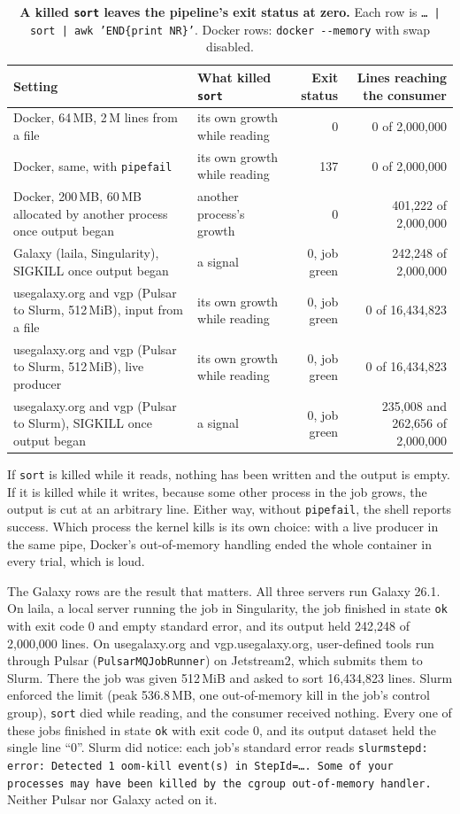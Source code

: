 \documentclass[11pt,letterpaper]{article}
\newcommand{\code}[1]{\texttt{#1}}
\begin{document}
\begin{table}[ht]
\centering
\small
\caption{\textbf{A killed \code{sort} leaves the pipeline's exit status at zero.} Each row is
\code{\ldots{} | sort | awk 'END\{print NR\}'}. Docker rows: \code{docker -{}-memory} with swap disabled.}
\label{tab:outcomes}
\begin{tabularx}{\textwidth}{@{}>{\raggedright\arraybackslash}X l r r@{}}
\toprule
Setting & What killed \code{sort} & Exit status & Lines reaching the consumer \\
\midrule
Docker, 64\,MB, 2\,M lines from a file & its own growth while reading & 0 & 0 of 2{,}000{,}000 \\
Docker, same, with \code{pipefail} & its own growth while reading & 137 & 0 of 2{,}000{,}000 \\
Docker, 200\,MB, 60\,MB allocated by another process once output began & another process's growth & 0 & 401{,}222 of 2{,}000{,}000 \\
Galaxy (laila, Singularity), SIGKILL once output began & a signal & 0, job green & 242{,}248 of 2{,}000{,}000 \\
usegalaxy.org and vgp (Pulsar to Slurm, 512\,MiB), input from a file & its own growth while reading & 0, job green & 0 of 16{,}434{,}823 \\
usegalaxy.org and vgp (Pulsar to Slurm, 512\,MiB), live producer & its own growth while reading & 0, job green & 0 of 16{,}434{,}823 \\
usegalaxy.org and vgp (Pulsar to Slurm), SIGKILL once output began & a signal & 0, job green & 235{,}008 and 262{,}656 of 2{,}000{,}000 \\
\bottomrule
\end{tabularx}
\end{table}

If \code{sort} is killed while it reads, nothing has been written and the output is empty. If it is killed while it
writes, because some other process in the job grows, the output is cut at an arbitrary line. Either way, without
\code{pipefail}, the shell reports success. Which process the kernel kills is its own choice: with a live producer
in the same pipe, Docker's out-of-memory handling ended the whole container in every trial, which is loud.

The Galaxy rows are the result that matters. All three servers run Galaxy 26.1. On laila, a local server running
the job in Singularity, the job finished in state \code{ok} with exit code 0 and empty standard error, and its output
held 242{,}248 of 2{,}000{,}000 lines. On usegalaxy.org and vgp.usegalaxy.org, user-defined tools run through Pulsar
(\code{PulsarMQJobRunner}) on Jetstream2, which submits them to Slurm. There the job was given 512\,MiB and asked to sort 16{,}434{,}823 lines. Slurm enforced the limit (peak 536.8\,MB, one
out-of-memory kill in the job's control group), \code{sort} died while reading, and the consumer received nothing.
Every one of these jobs finished in state \code{ok} with exit code 0, and its output dataset held the single line
``0''. Slurm did notice: each job's standard error reads \code{slurmstepd: error: Detected 1 oom-kill event(s) in
StepId=\ldots. Some of your processes may have been killed by the cgroup out-of-memory handler.} Neither Pulsar
nor Galaxy acted on it.
\end{document}
